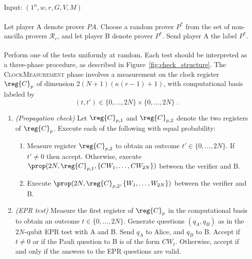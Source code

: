 \vspace{10pt}
\begin{center}
\begin{mdframed}
    Input: $(1^n,w,r,G,V,M)$ \\
    \\
	Let player A denote prover $PA$.
    Choose a random prover $P^*$ from the set of non-ancilla provers $\mathcal{R}_r$, and let player B denote prover $P^*$. Send player A the label $P^*$. \\
    \\
    Perform one of the tests uniformly at random. Each test should be interpreted as a three-phase procedure, as described in Figure~\ref{fig:check_structure}. The \textsc{ClockMeasurement} phase involves a measurement on the clock register $\reg{C}_p$ of dimension $2(N+1)(\kappa(r-1)+1)$, with computational basis labeled by 
    \[
    (t,t')\in \{0,\ldots,2N\} \times \{0,\ldots,2N\}\; .
    \]
    
	\begin{enumerate}

\item \emph{(Propagation check)} Let $\reg{C}_{p,1}$ and $\reg{C}_{p,2}$ denote the two registers of $\reg{C}_p$. Execute each of the following with equal probability:
\begin{enumerate}
\item Measure register $\reg{C}_{p,2}$ to obtain an outcome $t'\in\{0,\ldots,2N\}$. If $t'\neq 0$ then accept. Otherwise, execute $\prop(2N,\reg{C}_{p,1},\{CW_1,\ldots,CW_{2N}\})$ between the verifier and B.
\item Execute $\prop(2N,\reg{C}_{p,2},\{W_1,\ldots,W_{2N}\})$ between the verifier and B.
\end{enumerate}

 \item \emph{(EPR test)} Measure the first register of $\reg{C}_{p}$ in the computational basis to obtain an outcome $t\in\{0,\ldots,2N\}$. 
Generate questions $(q_A,q_B)$ as in the $2N$-qubit EPR test with A and B. Send $q_A$ to Alice, and $q_B$ to B. Accept if $t\neq 0$ or if the Pauli question to B is of the form $CW_t$. Otherwise, accept if and only if the answers to the EPR questions are valid.


\end{enumerate}
\end{mdframed}
\end{center}
